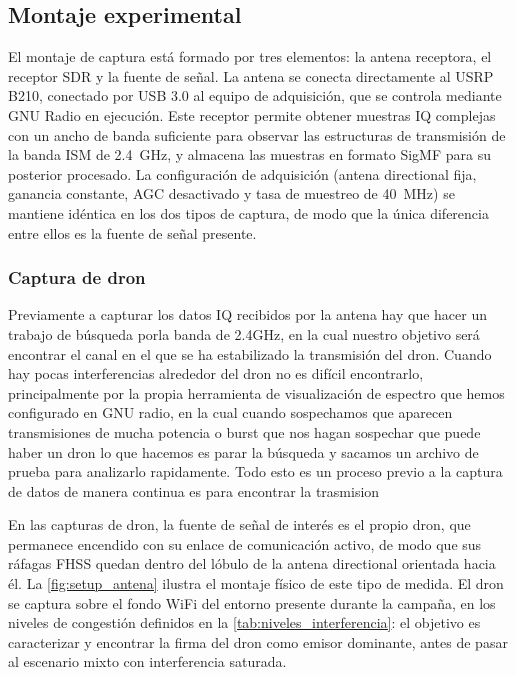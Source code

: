 \subsection{Montaje experimental}
\label{sec:montaje_experimental}

El montaje de captura está formado por tres elementos: la antena receptora, el receptor SDR y la fuente de señal. La antena se conecta directamente al USRP B210, conectado por USB 3.0 al equipo de adquisición, que se controla mediante GNU Radio en ejecución. Este receptor permite obtener muestras IQ complejas con un ancho de banda suficiente para observar las estructuras de transmisión de la banda ISM de \SI{2.4}{\giga\hertz}, y almacena las muestras en formato SigMF para su posterior procesado. La configuración de adquisición (antena directional fija, ganancia constante, AGC desactivado y tasa de muestreo de \SI{40}{\mega\hertz}) se mantiene idéntica en los dos tipos de captura, de modo que la única diferencia entre ellos es la fuente de señal presente.

\subsubsection{Captura de dron}

Previamente a capturar los datos IQ recibidos por la antena hay que hacer un trabajo de búsqueda porla banda de 2.4GHz, en la cual nuestro objetivo será encontrar el canal en el que se ha estabilizado la transmisión del dron. Cuando hay pocas interferencias alrededor del dron no es difícil encontrarlo, principalmente por la propia herramienta de visualización de espectro que hemos configurado en GNU radio, en la cual cuando sospechamos que aparecen transmisiones de mucha potencia o burst que nos hagan sospechar que puede haber un dron lo que hacemos es parar la búsqueda y sacamos un archivo de prueba para analizarlo rapidamente. Todo esto es un proceso previo a la captura de datos de manera continua es para encontrar la trasmision




En las capturas de dron, la fuente de señal de interés es el propio dron, que permanece encendido con su enlace de comunicación activo, de modo que sus ráfagas FHSS quedan dentro del lóbulo de la antena directional orientada hacia él. La \cref{fig:setup_antena} ilustra el montaje físico de este tipo de medida. El dron se captura sobre el fondo WiFi del entorno presente durante la campaña, en los niveles de congestión definidos en la \cref{tab:niveles_interferencia}: el objetivo es caracterizar y encontrar la firma del dron como emisor dominante, antes de pasar al escenario mixto con interferencia saturada. 

